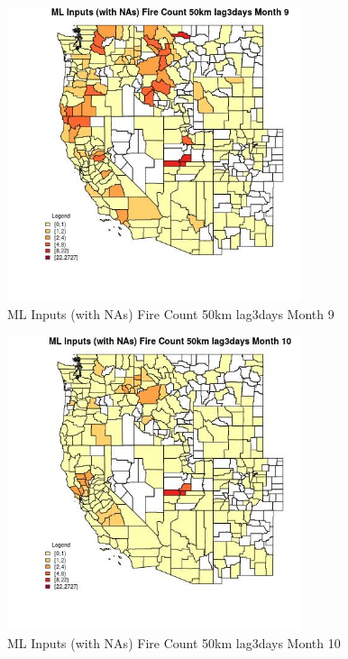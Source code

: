 \begin{figure} 
\centering  
\includegraphics[width=0.77\textwidth]{Code_Outputs/Report_ML_input_PM25_Step4_part_f_de_duplicated_aves_prioritize_24hr_obswNAs_CountyFire_Count_50km_lag3daysmedianMonth9.jpg} 
\caption{\label{fig:Report_ML_input_PM25_Step4_part_f_de_duplicated_aves_prioritize_24hr_obswNAsCountyFire_Count_50km_lag3daysmedianMonth9}ML Inputs (with NAs) Fire Count 50km lag3days Month 9} 
\end{figure} 
 

\begin{figure} 
\centering  
\includegraphics[width=0.77\textwidth]{Code_Outputs/Report_ML_input_PM25_Step4_part_f_de_duplicated_aves_prioritize_24hr_obswNAs_CountyFire_Count_50km_lag3daysmedianMonth10.jpg} 
\caption{\label{fig:Report_ML_input_PM25_Step4_part_f_de_duplicated_aves_prioritize_24hr_obswNAsCountyFire_Count_50km_lag3daysmedianMonth10}ML Inputs (with NAs) Fire Count 50km lag3days Month 10} 
\end{figure} 
 

